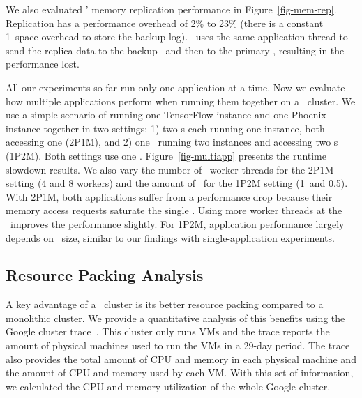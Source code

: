 We also evaluated \lego' memory replication performance in Figure~\ref{fig-mem-rep}.
Replication has a performance overhead of 2\% to 23\% (there is a constant 1\MB\ space overhead to store the backup log).
\lego\ uses the same application thread to send the replica data to the backup \mcomponent\ and then 
to the primary \mcomponent, resulting in the performance lost. 

All our experiments so far run only one application at a time.
Now we evaluate how multiple applications perform when running them together on a \lego\ cluster.
We use a simple scenario of running one TensorFlow instance and one Phoenix instance together in two settings:
1) two \pcomponent{}s each running one instance, both accessing one \mcomponent (2P1M),
and 2) one \pcomponent\ running two instances and accessing two \mcomponent{}s (1P2M).
Both settings use one \scomponent. Figure~\ref{fig-multiapp} presents the runtime slowdown results.
We also vary the number of \mcomponent\ worker threads for the 2P1M setting (4 and 8 workers)
and the amount of \excache\ for the 1P2M setting (1\GB\ and 0.5\GB).
With 2P1M, both applications suffer from a performance drop
because their memory access requests saturate the single \mcomponent.
Using more worker threads at the \mcomponent\ improves the performance slightly.
For 1P2M, application performance largely depends on \excache\ size, similar to our findings with single-application experiments.



\subsection{Resource Packing Analysis}
\label{sec:cost}
A key advantage of a \lego\ cluster is its better resource packing compared to a monolithic cluster.
We provide a quantitative analysis of this benefits using the Google cluster trace~\cite{GoogleTrace}.
This cluster only runs VMs and the trace reports the amount of physical machines used to run the VMs 
in a 29-day period. 
The trace also provides the total amount of CPU and memory in each physical machine
and the amount of CPU and memory used by each VM.
With this set of information, we calculated the CPU and memory utilization of the whole Google cluster.

